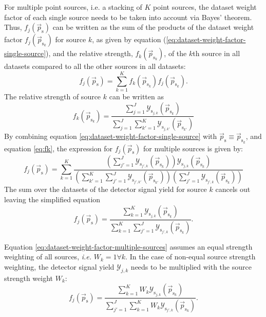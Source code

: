 \documentclass{article}
\newcommand{\ps}{\vec{p}_{\mathrm{s}}}
\newcommand{\psk}{\vec{p}_{\mathrm{s}_k}}
\begin{document}
For multiple point sources, i.e. a stacking of $K$ point sources, the dataset
weight factor of each single source needs
to be taken into account via Bayes' theorem. Thus, $f_{j}(\ps)$ can be written
as the sum of the products of the dataset weight factor $f_{j}(\psk)$ for
source $k$, as given by equation (\ref{eq:dataset-weight-factor-single-source}),
and the relative strength, $f_{k}(\psk)$, of the $k$th source in all datasets
compared to all the other sources in all datasets:
\begin{equation}
 f_{j}(\ps) = \sum_{k=1}^{K} f_{k}(\psk) f_{j}(\psk).
\end{equation}
The relative strength of source $k$ can be written as
\begin{equation}
 f_{k}(\psk) = \frac{\sum_{j=1}^{J} \mathcal{Y}_{\mathrm{s}_{j,k}}(\psk)}{ \sum_{j=1}^{J} \sum_{k'=1}^{K} \mathcal{Y}_{\mathrm{s}_{j,k'}}(\vec{p}_{\mathrm{s}_{k'}}) }
 \label{eq:fk}
\end{equation}
By combining equation \ref{eq:dataset-weight-factor-single-source} with
$\ps \equiv \psk$, and equation \ref{eq:fk}, the expression for
$f_{j}(\ps)$ for multiple sources is given by:
\begin{equation}
 f_{j}(\ps) = \sum_{k=1}^{K}
    \frac{\left(\sum_{j'=1}^{J} \mathcal{Y}_{\mathrm{s}_{j',k}}(\psk)\right) \mathcal{Y}_{\mathrm{s}_{j,k}}(\psk)}
         {\left(\sum_{k'=1}^{K} \sum_{j'=1}^{J} \mathcal{Y}_{\mathrm{s}_{j',k'}}(\vec{p}_{\mathrm{s}_{k'}})\right) \left( \sum_{j'=1}^{J} \mathcal{Y}_{\mathrm{s}_{j',k}}(\psk) \right)}
\end{equation}
The sum over the datasets of the detector signal yield for source $k$ cancels
out leaving the simplified equation
\begin{equation}
 f_{j}(\ps) = \frac{\sum_{k=1}^{K} \mathcal{Y}_{\mathrm{s}_{j,k}}(\psk)}
                   {\sum_{k=1}^{K} \sum_{j'=1}^{J} \mathcal{Y}_{\mathrm{s}_{j',k}}(\psk)}.
 \label{eq:dataset-weight-factor-multiple-sources}
\end{equation}

Equation \ref{eq:dataset-weight-factor-multiple-sources} assumes an equal
strength weighting of all sources, \emph{i.e.} $W_k = 1 \forall k$. In the case
of non-equal source strength weighting, the detector signal yield
$\mathcal{Y}_{j,k}$ needs to be multiplied with the source strength weight
$W_k$:
\begin{equation}
 f_{j}(\ps) = \frac{\sum_{k=1}^{K} W_k \mathcal{Y}_{\mathrm{s}_{j,k}}(\psk)}
                   {\sum_{j'=1}^{J} \sum_{k=1}^{K} W_k \mathcal{Y}_{\mathrm{s}_{j',k}}(\psk)}.
 \label{eq:dataset-weight-factor-multiple-sources-with-source-strength-weight}
\end{equation}
\end{document}
